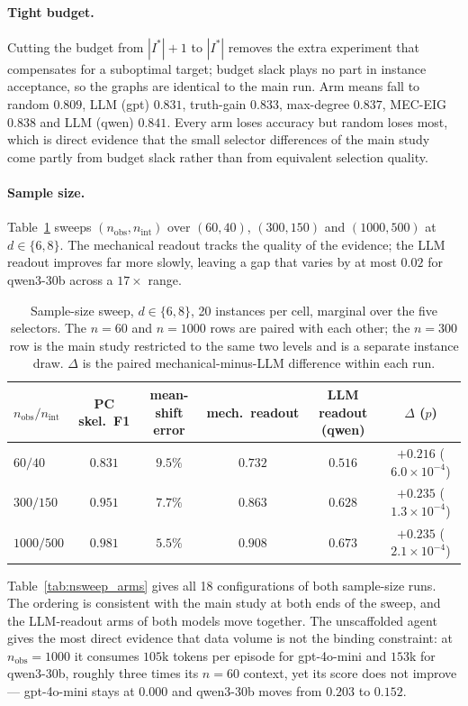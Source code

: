 \documentclass{article}
\begin{document}
\paragraph{Tight budget.}
Cutting the budget from $|I^*|+1$ to $|I^*|$ removes the extra experiment that compensates for
a suboptimal target; budget slack plays no part in instance acceptance, so the graphs are
identical to the main run. Arm means fall to random $0.809$, LLM (gpt) $0.831$, truth-gain
$0.833$, max-degree $0.837$, MEC-EIG $0.838$ and LLM (qwen) $0.841$. Every arm loses accuracy
but random loses most, which is direct evidence that the small selector differences of the
main study come partly from budget slack rather than from equivalent selection quality.

\paragraph{Sample size.}
Table~\ref{tab:nsweep} sweeps $(n_{\mathrm{obs}}, n_{\mathrm{int}})$ over $(60,40)$,
$(300,150)$ and $(1000,500)$ at $d \in \{6,8\}$. The mechanical readout tracks the quality of
the evidence; the LLM readout improves far more slowly, leaving a gap that varies by at most
$0.02$ for qwen3-30b across a $17\times$ range.

\begin{table}[h]
\caption{Sample-size sweep, $d \in \{6,8\}$, 20 instances per cell, marginal over the five
selectors. The $n=60$ and $n=1000$ rows are paired with each other; the $n=300$ row is the
main study restricted to the same two levels and is a separate instance draw. $\Delta$ is the
paired mechanical-minus-LLM difference within each run.}
\label{tab:nsweep}
\centering
\small
\setlength{\tabcolsep}{4.7pt}
\begin{tabular}{lccccc}
\toprule
$n_{\mathrm{obs}}/n_{\mathrm{int}}$ & PC skel.\ F1 & mean-shift error & mech.\ readout & LLM readout (qwen) & $\Delta$ ($p$) \\
\midrule
$60/40$ & $0.831$ & $9.5\%$ & $0.732$ & $0.516$ & $+0.216$ ($6.0{\times}10^{-4}$) \\
$300/150$ & $0.951$ & $7.7\%$ & $0.863$ & $0.628$ & $+0.235$ ($1.3{\times}10^{-4}$) \\
$1000/500$ & $0.981$ & $5.5\%$ & $0.908$ & $0.673$ & $+0.235$ ($2.1{\times}10^{-4}$) \\
\bottomrule
\end{tabular}
\end{table}

Table~\ref{tab:nsweep_arms} gives all 18 configurations of both sample-size runs. The ordering
is consistent with the main study at both ends of the sweep, and the LLM-readout arms of both
models move together. The unscaffolded agent gives the most direct evidence that data volume
is not the binding constraint: at $n_{\mathrm{obs}}=1000$ it consumes $105$k tokens per
episode for gpt-4o-mini and $153$k for qwen3-30b, roughly three times its $n=60$ context, yet
its score does not improve --- gpt-4o-mini stays at $0.000$ and qwen3-30b moves from $0.203$
to $0.152$.
\end{document}
